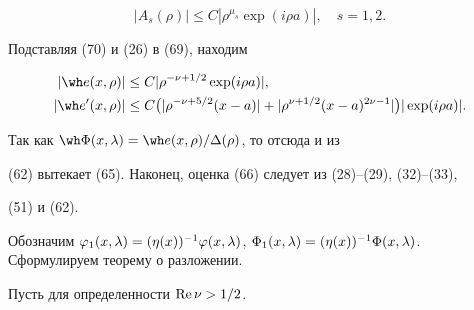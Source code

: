 \begin{pf}
\begin{equation}
|A_s(\rho)|\le C |\rho^{\mu_s}\exp(i\rho a)|,\quad s=1,2.


\end{equation}


Подставляя (70) и (26) в (69), находим


\begin{align*}


|\wh e(x,\rho)|&\le C |\rho^{-\nu+1/2}\exp(i\rho a)|, \\


%


|\wh e'(x,\rho)|&\le C\big(|\rho^{-\nu+5/2}(x-a)|+


|\rho^{\nu+1/2}(x-a)^{2\nu-1}|\big)|\exp(i\rho a)|.


\end{align*}


Так как $\wh\Phi(x,\la)=\wh e(x,\rho)/\Delta(\rho)$, то отсюда и из


(62) вытекает (65). Наконец, оценка (66) следует из (28)--(29), (32)--(33),


(51) и (62).


\end{pf}





Обозначим $\vv_1(x,\la)=(\eta(x))^{-1}\vv(x,\la)$, $\Phi_1(x,\la)=


(\eta(x))^{-1}\Phi(x,\la)$. Сформулируем теорему о разложении.


Пусть для определенности $\operatorname{Re}\nu>1/2$.





